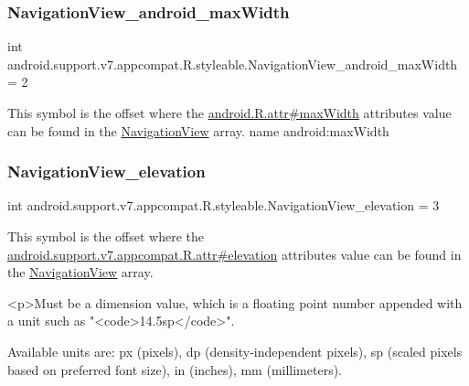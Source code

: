 \subsubsection{\texorpdfstring{Navigation\+View\+\_\+android\+\_\+max\+Width}{NavigationView\_android\_maxWidth}}
{\footnotesize\ttfamily int android.\+support.\+v7.\+appcompat.\+R.\+styleable.\+Navigation\+View\+\_\+android\+\_\+max\+Width = 2\hspace{0.3cm}{\ttfamily [static]}}

This symbol is the offset where the \hyperlink{}{android.\+R.\+attr\#max\+Width} attribute\textquotesingle{}s value can be found in the \hyperlink{classandroid_1_1support_1_1v7_1_1appcompat_1_1R_1_1styleable_a52cfb3ba7bdfc8fb2cca459f35c24456}{Navigation\+View} array.  name android\+:max\+Width \mbox{\label{classandroid_1_1support_1_1v7_1_1appcompat_1_1R_1_1styleable_a9b37fb60ab34a99e03f8fd95245baa0c}} 
\subsubsection{\texorpdfstring{Navigation\+View\+\_\+elevation}{NavigationView\_elevation}}
{\footnotesize\ttfamily int android.\+support.\+v7.\+appcompat.\+R.\+styleable.\+Navigation\+View\+\_\+elevation = 3\hspace{0.3cm}{\ttfamily [static]}}

This symbol is the offset where the \hyperlink{classandroid_1_1support_1_1v7_1_1appcompat_1_1R_1_1attr_a4ad8a7d23ae4731f5836683e9cb7f790}{android.\+support.\+v7.\+appcompat.\+R.\+attr\#elevation} attribute\textquotesingle{}s value can be found in the \hyperlink{classandroid_1_1support_1_1v7_1_1appcompat_1_1R_1_1styleable_a52cfb3ba7bdfc8fb2cca459f35c24456}{Navigation\+View} array.

\begin{DoxyVerb}      <p>Must be a dimension value, which is a floating point number appended with a unit such as "<code>14.5sp</code>".
\end{DoxyVerb}
 Available units are\+: px (pixels), dp (density-\/independent pixels), sp (scaled pixels based on preferred font size), in (inches), mm (millimeters). 

